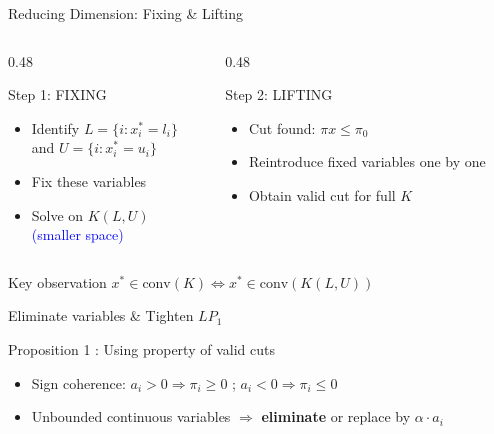 \documentclass[aspectratio=169,xcolor=dvipsnames]{beamer}
\begin{document}
\begin{frame}{Reducing Dimension: Fixing \& Lifting}
	
	\begin{columns}
		\begin{column}{0.48\textwidth}
			\begin{block}{Step 1: FIXING}
				\begin{itemize}
					\item Identify $L = \{i : x^*_i = l_i\}$ \\
					and $U = \{i : x^*_i = u_i\}$
					\item Fix these variables
					\item Solve on $K(L,U)$ \\
					\textcolor{blue}{(smaller space)}
				\end{itemize}
			\end{block}
		\end{column}
		
		\begin{column}{0.48\textwidth}
			\begin{block}{Step 2: LIFTING}
				\begin{itemize}
					\item Cut found: $\pi x \leq \pi_0$
					\item Reintroduce fixed variables one by one
					\item Obtain valid cut for full $K$
				\end{itemize}
			\end{block}
		\end{column}
	\end{columns}
	
	\vspace{0.4cm}
	\begin{exampleblock}{Key observation}
		$x^* \in \text{conv}(K) \Leftrightarrow x^* \in \text{conv}(K(L,U))$
	\end{exampleblock}
	
\end{frame}

\begin{frame}{Eliminate variables \& Tighten $LP_1$}

	\begin{block}{Proposition 1 : Using property of valid cuts}
		\begin{itemize}
			\item Sign coherence: $a_i > 0 \Rightarrow \pi_i \geq 0$ \quad ; \quad $a_i < 0 \Rightarrow \pi_i \leq 0$
			\item Unbounded continuous variables $\Rightarrow$ \textbf{eliminate} or replace by $\alpha \cdot a_i$
		\end{itemize}
	\end{block}


\end{frame}
\end{document}
